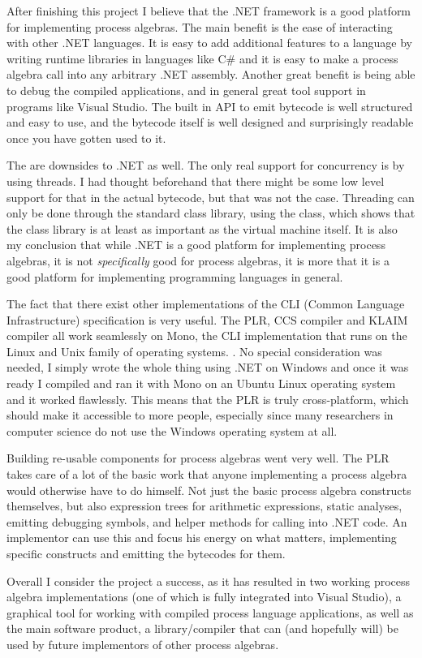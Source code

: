 	After finishing this project I believe that the .NET framework is a
	good platform for implementing process algebras. The main benefit is the 
	ease of interacting with other .NET languages. It is easy to add additional 
	features to a language by writing runtime libraries in languages like C\# 
	and it is easy to make a process algebra call into any arbitrary .NET 
	assembly. Another great benefit is being able to debug the compiled 
	applications, and in general great tool support in programs like Visual 
	Studio. The built in API to emit bytecode is well structured and easy to 
	use, and the bytecode itself is well designed and surprisingly readable once 
	you have gotten used to it. 
	
	The are downsides to .NET as well. The only real support for concurrency is 
	by using threads. I had thought beforehand that there might be some low 
	level support for that in the actual bytecode, but that was not the case. 
	Threading can only be done through the standard class library, using the 
	 class, which shows that the class library is at least as 
	important as the virtual machine itself. It is also my conclusion that while
	.NET is a good platform for implementing process algebras, it is not 
	\textit{specifically} good for process algebras, it is more that it is a 
	good platform for implementing programming languages in general. 

	The fact that there exist other implementations of the CLI (Common Language 
	Infrastructure) specification is very useful. The PLR, CCS compiler and 
	KLAIM compiler all work seamlessly on Mono, the CLI implementation that 
	runs on the Linux and Unix family of operating systems. . No special consideration was needed, I simply wrote the 
	whole thing using .NET on Windows and once it was ready I compiled and ran 
	it with Mono on an Ubuntu Linux operating system and it worked flawlessly. 
	This means that the PLR is truly cross-platform, which should make it 
	accessible to more people, especially since many researchers in computer 
	science do not use the Windows operating system at all.

	Building re-usable components for process algebras went very well. The PLR 
	takes care of a lot of the basic work that anyone implementing a process 
	algebra would otherwise have to do himself. Not just the basic process 
	algebra constructs themselves, but also expression trees for arithmetic 
	expressions, static analyses, emitting debugging symbols, and helper methods 
	for calling into .NET code. An implementor can use this and focus his energy 
	on what matters, implementing specific constructs and emitting the bytecodes 
	for them.
	
	Overall I consider the project a success, as it has resulted in two working 
	process algebra implementations (one of which is fully integrated into 
	Visual Studio), a graphical tool for working with compiled process language 
	applications, as well as the main software product, a library/compiler that 
	can (and hopefully will) be used by future implementors of other process 
	algebras.